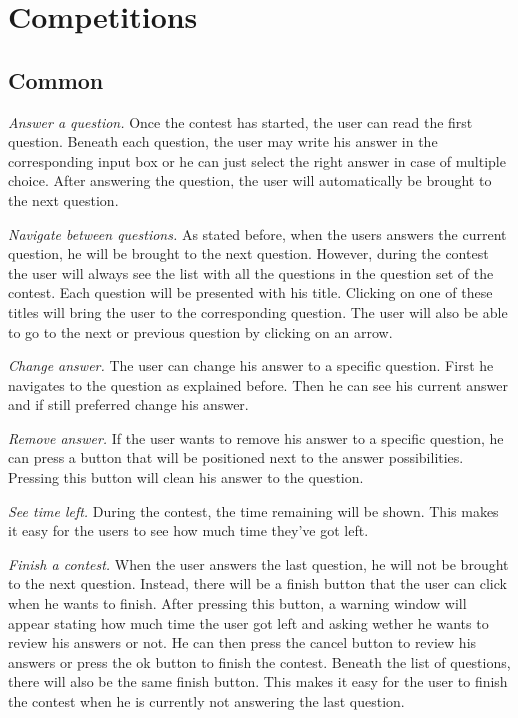 \section*{Competitions}

\subsection*{Common}

\textit{Answer a question.} 
Once the contest has started, the user can read the first question. Beneath each question, the user may write his answer in the corresponding input box or he can just select the right answer in case of multiple choice. After answering the question, the user will automatically be brought to the next question. 

\textit{Navigate between questions.} 
As stated before, when the users answers the current question, he will be brought to the next question. However, during the contest the user will always see the list with all the questions in the question set of the contest. Each question will be presented with his title. Clicking on one of these titles will bring the user to the corresponding question. The user will also be able to go to the next or previous question by clicking on an arrow. 

\textit{Change answer.} 
The user can change his answer to a specific question. First he navigates to the question as explained before. Then he can see his current answer and if still preferred change his answer. 

\textit{Remove answer.} 
If the user wants to remove his answer to a specific question, he can press a button that will be positioned next to the answer possibilities. Pressing this button will clean his answer to the question. 

\textit{See time left.} 
During the contest, the time remaining will be shown. This makes it easy for the users to see how much time they've got left. 

\textit{Finish a contest.} 
When the user answers the last question, he will not be brought to the next question. Instead, there will be a finish button that the user can click when he wants to finish. After pressing this button, a warning window will appear stating how much time the user got left and asking wether he wants to review his answers or not. He can then press the cancel button to review his answers or press the ok button to finish the contest. Beneath the list of questions, there will also be the same finish button. This makes it easy for the user to finish the contest when he is currently not answering the last question. 

